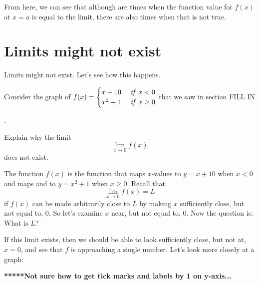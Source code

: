 \documentclass{ximera}
\begin{document}
From here, we can see that although are times when the function value for $f(x)$ at $x=a$ is equal to the limit, there are also times when that is not true.




\section{Limits might not exist}

Limits might not exist. Let's see how this happens.


\begin{example}
  Consider the graph of 
$f(x)=\begin{cases} x+10 & \mbox{ \emph{if} }x<0\\x^2+1 & \mbox{ \emph{if} } x\geq 0\end{cases}$
that we saw in section FILL IN
\begin{image}
.
\end{image}

Explain why the limit
\[
\lim_{x\to 0} f(x)
\]
does not exist.
\begin{explanation}
The function $f(x)$ is the function that maps $x$-values to $y=x+10$ when $x<0$ and maps and to $y=x^2+1$ when $x\geq 0$. Recall that
\[
\lim_{x\to 0} f(x)  = L
\]
if $f(x)$ can be made arbitrarily close to $L$ by making
$x$ sufficiently close, but not equal to, $0$. So let's examine $x$
near, but not equal to, $0$. Now the question is: What is $L$?



If this limit exists, then we should be able to look sufficiently
close, but not at, $x=0$, and see that $f$ is approaching a single number.
Let's look more closely at a graph:


\textbf{*****Not sure how to get tick marks and labels by 1 on y-axis...}

\begin{image}

\end{image}


\end{explanation}
\end{example}
\end{document}
